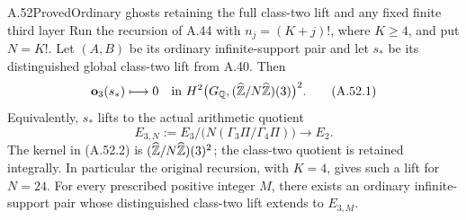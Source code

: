 \begin{statement}{A.52}{Proved}{Ordinary ghosts retaining the full class-two lift and any fixed finite third layer}
Run the recursion of A.44 with $n_j=(K+j)!$, where $K\ge4$,
and put $N=K!$.  Let $(A,B)$ be its ordinary infinite-support
pair and let $s_*$ be its distinguished global class-two lift
from A.40.  Then
\[
 \mathbf o_3(s_*)\longmapsto0
   \quad\text{in }H^2\bigl(G_\mathbb Q,
          (\widehat{\mathbb Z}/N\widehat{\mathbb Z})(3)\bigr)^2.
 \tag{A.52.1}
\]
Equivalently, $s_*$ lifts to the actual arithmetic quotient
\[
 E_{3,N}:=E_3/\bigl(N(\Gamma_3\Pi/\Gamma_4\Pi)\bigr)
                   \longrightarrow E_2.
 \tag{A.52.2}
\]
The kernel in (A.52.2) is $(\widehat{\mathbb Z}/N\widehat{\mathbb Z})(3)^2$;
the class-two quotient is retained integrally.  In particular
the original recursion, with $K=4$, gives such a lift for
$N=24$.  For every prescribed positive integer $M$, there
exists an ordinary infinite-support pair whose distinguished
class-two lift extends to $E_{3,M}$.
\end{statement}
